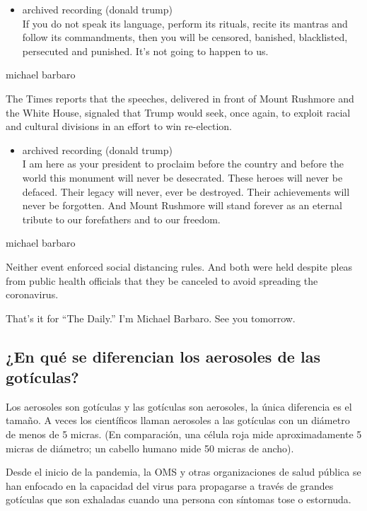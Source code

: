 \begin{itemize}
\tightlist
\item
  archived recording (donald trump)\\
  If you do not speak its language, perform its rituals, recite its
  mantras and follow its commandments, then you will be censored,
  banished, blacklisted, persecuted and punished. It's not going to
  happen to us.
\end{itemize}

michael barbaro

The Times reports that the speeches, delivered in front of Mount
Rushmore and the White House, signaled that Trump would seek, once
again, to exploit racial and cultural divisions in an effort to win
re-election.

\begin{itemize}
\tightlist
\item
  archived recording (donald trump)\\
  I am here as your president to proclaim before the country and before
  the world this monument will never be desecrated. These heroes will
  never be defaced. Their legacy will never, ever be destroyed. Their
  achievements will never be forgotten. And Mount Rushmore will stand
  forever as an eternal tribute to our forefathers and to our freedom.
\end{itemize}

michael barbaro

Neither event enforced social distancing rules. And both were held
despite pleas from public health officials that they be canceled to
avoid spreading the coronavirus.

That's it for ``The Daily.'' I'm Michael Barbaro. See you tomorrow.

\hypertarget{en-quuxe9-se-diferencian-los-aerosoles-de-las-gotuxedculas}{%
\subsection{¿En qué se diferencian los aerosoles de las
gotículas?}\label{en-quuxe9-se-diferencian-los-aerosoles-de-las-gotuxedculas}}

Los aerosoles son gotículas y las gotículas son aerosoles, la única
diferencia es el tamaño. A veces los científicos llaman aerosoles a las
gotículas con un diámetro de menos de 5 micras. (En comparación, una
célula roja mide aproximadamente 5 micras de diámetro; un cabello humano
mide 50 micras de ancho).

Desde el inicio de la pandemia, la OMS y otras organizaciones de salud
pública se han enfocado en la capacidad del virus para propagarse a
través de grandes gotículas que son exhaladas cuando una persona con
síntomas tose o estornuda.

